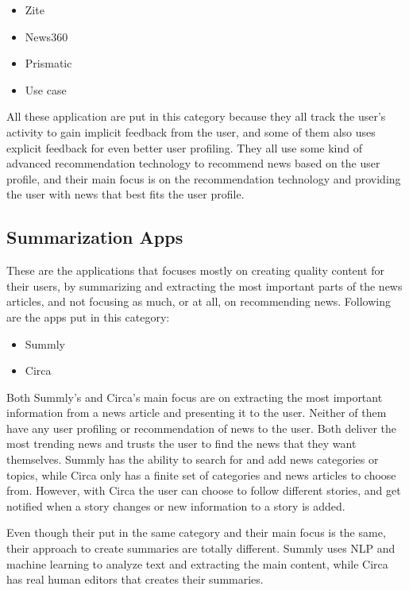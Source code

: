 \begin{itemize}
	\item Zite
	\item News360
	\item Prismatic
	\item Use case
\end{itemize}


All these application are put in this category because they all track the user's activity to gain implicit feedback from the user, and some of them also uses explicit feedback for even better user profiling. They all use some kind of advanced recommendation technology to recommend news based on the user profile, and their main focus is on the recommendation technology and providing the user with news that best fits the user profile.

\subsection{Summarization Apps}
These are the applications that focuses mostly on creating quality content for their users, by summarizing and extracting the most important parts of the news articles, and not focusing as much, or at all, on recommending news. Following are the apps put in this category:

\begin{itemize}
	\item Summly
	\item Circa
\end{itemize}

Both Summly's and Circa's main focus are on extracting the most important information from a news article and presenting it to the user. Neither of them have any user profiling or recommendation of news to the user. Both deliver the most trending news and trusts the user to find the news that they want themselves. Summly has the ability to search for and add news categories or topics, while Circa only has a finite set of categories and news articles to choose from. However, with Circa the user can choose to follow different stories, and get notified when a story changes or new information to a story is added.

Even though their put in the same category and their main focus is the same, their approach to create summaries are totally different. Summly uses NLP and machine learning to analyze text and extracting the main content, while Circa has real human editors that creates their summaries.



